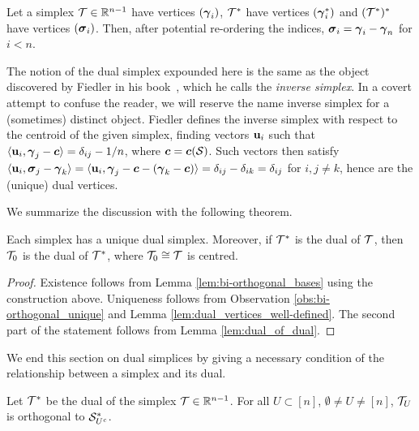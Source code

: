 \begin{lemma}
	\label{lem:dual_of_dual}
	Let a simplex $\mathcal{T}\in\mathbb{R}^{n-1}$ have vertices $(\vb*{\gamma}_i)$, $\mathcal{T}^*$ have vertices $(\vb*{\gamma}_i^*)$ and $(\mathcal{T}^*)^*$ have vertices $(\vb*{\sigma}_i)$. Then, after potential re-ordering the indices, $\vb*{\sigma}_i = \vb*{\gamma}_i-\vb*{\gamma}_n$ for $i<n$. 
\end{lemma}

\begin{remark}
	The notion of the dual simplex expounded here is the same as the object discovered by Fiedler in his book~\cite[Chapter 5]{fiedler2011matrices}, which he calls the \emph{inverse simplex}. In a covert attempt to confuse the reader, we will reserve the name inverse simplex for a (sometimes) distinct object. Fiedler defines the inverse simplex with respect to the centroid of the given simplex, finding vectors $\vb{u}_i$ such that $\langle \vb{u}_i,\vb*{\gamma}_j-\vb*{c}\rangle = \delta_{ij}-1/n$, where $\vb*{c}=\vb*{c}(\mathcal{S})$.  Such vectors then satisfy $\langle \vb{u}_i,\vb*{\sigma}_j-\vb*{\gamma}_k\rangle = \langle \vb{u}_i,\vb*{\gamma}_j-\vb*{c}-(\vb*{\gamma}_k-\vb*{c})\rangle = \delta_{ij}-\delta_{ik}=\delta_{ij}$ for $i,j\neq k$, hence are the (unique) dual vertices. 
\end{remark}

We summarize the discussion with the following theorem. 

\begin{theorem}
	\label{thm:dual_simplex}
Each simplex has a unique dual simplex. Moreover, if $\mathcal{T}^*$ is the dual of $\mathcal{T}$, then $\mathcal{T}_0$ is the dual of $\mathcal{T}^*$, where $\mathcal{T}_0\cong \mathcal{T}$ is centred. 
  \end{theorem}
\begin{proof}
Existence follows from Lemma \ref{lem:bi-orthogonal_bases} using the construction above. Uniqueness follows from Observation \ref{obs:bi-orthogonal_unique} and Lemma \ref{lem:dual_vertices_well-defined}. The second part of the statement follows from Lemma \ref{lem:dual_of_dual}. 
\end{proof}

We end  this section  on dual simplices by giving a necessary condition of the relationship between a simplex and its dual. 

\begin{lemma}
	\label{lem:dual_faces_orthogonal}
	Let $\mathcal{T}^*$ be the dual of the simplex $\mathcal{T}\in\mathbb{R}^{n-1}$. For all $U\subset[n]$, $\emptyset\neq U\neq[n]$, $\mathcal{T}_U$ is orthogonal to $\mathcal{S}_{U^c}^*$.  
\end{lemma}

